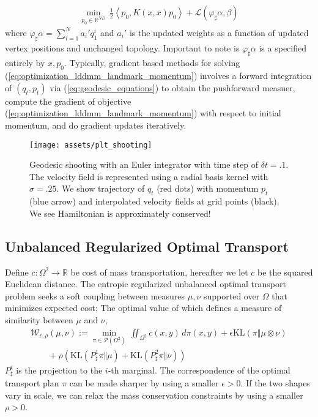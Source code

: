 \documentclass{6838publ}
\newcommand\sL{\ensuremath{\mathcal{L}}}
\newcommand\sP{\ensuremath{\mathcal{P}}}
\newcommand\sW{\ensuremath{\mathcal{W}}}
\newcommand\R{\ensuremath{\mathbb{R}}} %
\newcommand\inner[2]{\ensuremath{\left< #1, #2 \right>}} %
\begin{document}
\begin{align}
    \min_{p_0\in\R^{ND}} \,
        \frac{1}{2} \inner{ p_0 }{ K(x,x) p_0 } + \sL(\varphi_\sharp \alpha, \beta)
    \label{eq:optimization_lddmm_landmark_momentum}
\end{align}
where $\varphi_\sharp\alpha = \sum_{i=1}^N a_i' q_1^i$ and $a_i'$ is the updated weights as a function of updated vertex positions and unchanged topology. Important to note is $\varphi_\sharp\alpha$ is a specified entirely by $x,p_0$. Typically, gradient based methods for solving (\ref{eq:optimization_lddmm_landmark_momentum}) involves a forward integration of $(q_t,p_t)$ via (\ref{eq:geodesic_equations}) to obtain the pushforward measuer, compute the gradient of objective (\ref{eq:optimization_lddmm_landmark_momentum}) with respect to initial momentum, and do gradient updates iteratively.


\begin{center} 
\begin{figure}[t]
    \texttt{[image: assets/plt\_shooting]} 
    \caption{Geodesic shooting with an Euler integrator with time step of $\delta t = .1$. The velocity field is represented using a radial basis kernel with $\sigma=.25$. We show trajectory of $q_t$ (red dots) with momentum $p_t$ (blue arrow) and interpolated velocity fields at grid points (black). We see Hamiltonian is approximately conserved!}
    \label{fig:plt_shooting}
\end{figure} 
\end{center}


\subsection{Unbalanced Regularized Optimal Transport}

Define $c:\Omega^2 \to \R$ be cost of mass transportation, hereafter we let $c$ be the squared Euclidean distance. The entropic regularized unbalanced optimal transport problem seeks a soft coupling between measures $\mu,\nu$ supported over $\Omega$ that minimizes expected cost; The optimal value of which defines a measure of similarity between $\mu$ and $\nu$,
\begin{align}
    \sW_{\epsilon,\rho}(\mu,\nu)
        := \min_{\pi\in\sP(\Omega^2)}\,
            \iint_{\Omega^2} c(x,y)\, d\pi(x,y) + \epsilon \text{KL}(\pi \Vert \mu\otimes\nu) \\
                \quad\quad+\rho\left( \text{KL}(P^1_\sharp \pi \Vert \mu) + \text{KL}(P^2_\sharp \pi \Vert \nu) \right)
    \label{eq:ot_wasserstein_regularized_unbalanced}
\end{align}
$P^i_\sharp$ is the projection to the $i$-th marginal. The correspondence of the optimal transport plan $\pi$ can be made sharper by using a smaller $\epsilon >0$. If the two shapes vary in scale, we can relax the mass conservation constraints by using a smaller $\rho>0$. 
\end{document}
